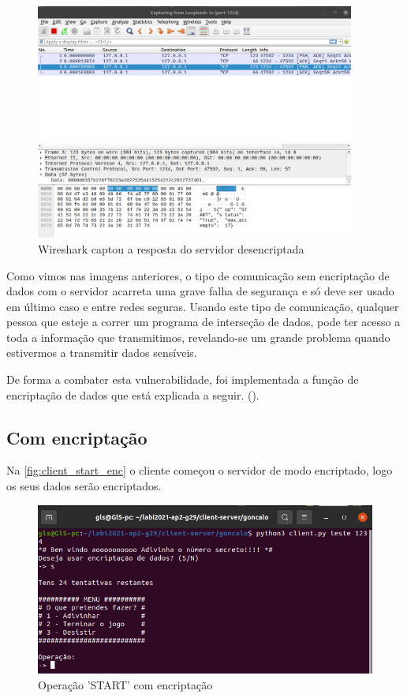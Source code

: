 \documentclass{report}
\begin{document}
\begin{figure}[!h]
\center 
\includegraphics[height=220pt]{img/non_encripted/wireshark_start_response.png}
\caption{Wireshark captou a resposta do servidor desencriptada}
\label{fig:wireshark_start_response}
\end{figure}

Como vimos nas imagens anteriores, o tipo de comunicação sem encriptação de dados com o servidor acarreta uma grave falha de segurança e só deve ser usado em último caso e entre redes seguras. Usando este tipo de comunicação, qualquer pessoa que esteje a correr um programa de interseção de dados, pode ter acesso a toda a informação que transmitimos, revelando-se um grande problema quando estivermos a transmitir dados sensíveis.

De forma a combater esta vulnerabilidade, foi implementada a função de encriptação de dados que está explicada a seguir. ().

\subsection{Com encriptação}
\label{ssec:wireshark_encrypt}

Na \autoref{fig:client_start_enc} o cliente começou o servidor de modo encriptado, logo os seus dados serão encriptados.

\begin{figure}[!h]
\center 
\includegraphics[height=160pt]{img/encripted/client_start.png}
\caption{Operação 'START' com encriptação}
\label{fig:client_start_enc}
\end{figure}
\end{document}
